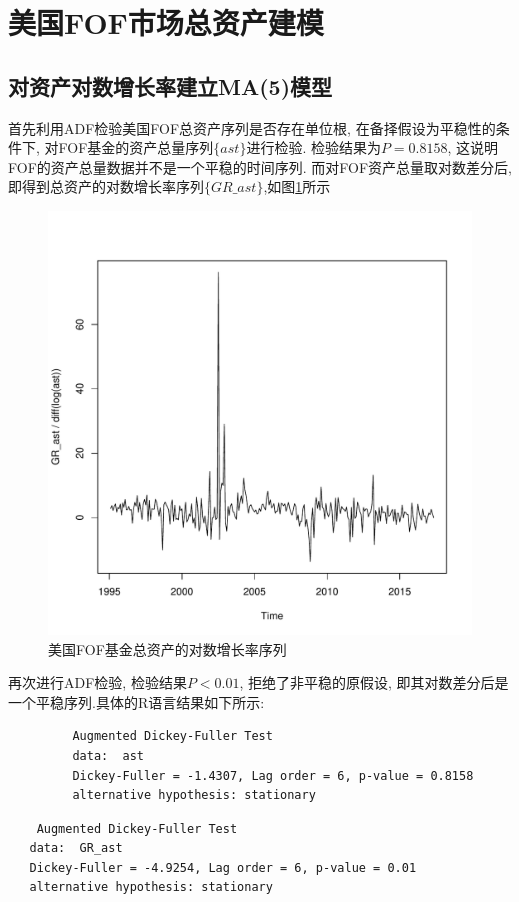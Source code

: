 \section{美国FOF市场总资产建模}

\subsection{对资产对数增长率建立MA(5)模型}
首先利用ADF检验美国FOF总资产序列是否存在单位根, 在备择假设为平稳性的条件下, 对FOF基金的资产总量序列$\{ast\}$进行检验. 检验结果为$P=0.8158$, 这说明FOF的资产总量数据并不是一个平稳的时间序列. 而对FOF资产总量取对数差分后,即得到总资产的对数增长率序列$\{GR\_ast\}$,如图\ref{fig:unnamed-chunk-1-2}所示


\begin{figure}[h!]
	\centering
	\includegraphics[width=0.6\linewidth]{pic/ast/unnamed-chunk-1-2}
	\caption{美国FOF基金总资产的对数增长率序列}
	\label{fig:unnamed-chunk-1-2}
\end{figure}
 再次进行ADF检验, 检验结果$P<0.01$, 拒绝了非平稳的原假设, 即其对数差分后是一个平稳序列.具体的R语言结果如下所示:
\begin{framed}
		 \begin{verbatim}
		 Augmented Dickey-Fuller Test
		 data:  ast
		 Dickey-Fuller = -1.4307, Lag order = 6, p-value = 0.8158
		 alternative hypothesis: stationary
		\end{verbatim}
	\end{framed}
\begin{framed}
	\begin{verbatim}
 	Augmented Dickey-Fuller Test 
   data:  GR_ast
   Dickey-Fuller = -4.9254, Lag order = 6, p-value = 0.01
   alternative hypothesis: stationary
	\end{verbatim}
\end{framed}
